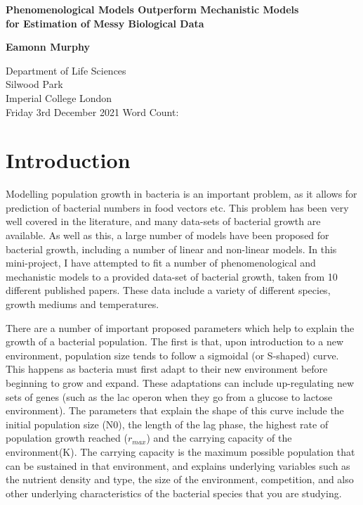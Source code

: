 \documentclass[11pt,a4wide,titlepage]{article}
\begin{document}
\begin{titlepage}
	\begin{center}
		\vspace*{1cm}
		
		\begin{Large}
			\textbf{Phenomenological Models Outperform Mechanistic Models\\
				for Estimation of Messy Biological Data}
		\end{Large}
		
		
		\vspace{1.5cm}
		
		\textbf{Eamonn Murphy}
		
		\vfill
		
		Department of Life Sciences\\
		Silwood Park\\
		Imperial College London\\
		\vspace{\baselineskip}
		Friday 3rd December 2021
		\vspace{\baselineskip}
		Word Count: 
		\vfill
		
	\end{center}
\end{titlepage}

\section*{Introduction}
Modelling population growth in bacteria is an important problem, as it allows for prediction of bacterial numbers in food vectors etc. This problem has been very well covered in the literature, and many data-sets of bacterial growth are available. As well as this, a large number of models have been proposed for bacterial growth, including a number of linear and non-linear models. In this mini-project, I have attempted to fit a number of phenomenological and mechanistic models to a provided data-set of bacterial growth, taken from 10 different published papers. These data include a variety of different species, growth mediums and temperatures.

There are a number of important proposed parameters which help to explain the growth of a bacterial population. The first is that, upon introduction to a new environment, population size tends to follow a sigmoidal (or S-shaped) curve. This happens as bacteria must first adapt to their new environment before beginning to grow and expand. These adaptations can include up-regulating new sets of genes (such as the lac operon when they go from a glucose to lactose environment). The parameters that explain the shape of this curve include the initial population size (N0), the length of the lag phase, the highest rate of population growth reached ($r_{max}$) and the carrying capacity  of the environment(K). The carrying capacity is the maximum possible population that can be sustained in that environment, and explains underlying variables such as the nutrient density and type, the size of the environment, competition, and also other underlying characteristics of the bacterial species that you are studying.
\end{document}
